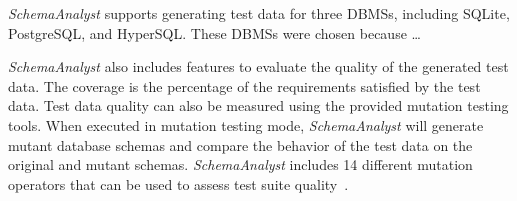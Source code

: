 \textit{SchemaAnalyst} supports generating test data for three DBMSs, including SQLite, PostgreSQL, and HyperSQL.
These DBMSs were chosen because \dots

\textit{SchemaAnalyst} also includes features to evaluate the quality of the generated test data. The
coverage is the percentage of the requirements satisfied by the test data. 
Test data quality can also be measured using the provided mutation testing tools. When executed in
mutation testing mode, \textit{SchemaAnalyst} will generate mutant database schemas and compare the
behavior of the test data on the original and mutant schemas. \textit{SchemaAnalyst} includes 14
different mutation operators that can be used to assess test suite quality~\cite{}.


